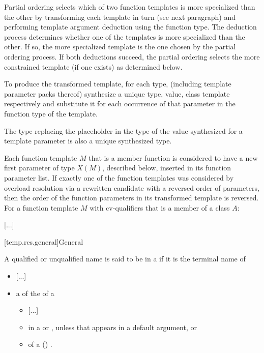 \documentclass{wg21}
\begin{document}
\pnum
Partial ordering selects which of two function templates is more
specialized than the other by transforming each template in turn
(see next paragraph) and performing template argument deduction
using the function type.
The deduction process determines whether
one of the templates is more specialized than the other. If so, the
more specialized template is the one chosen by the partial ordering
process.
If both deductions succeed, the partial ordering selects
the more constrained template (if one exists) as determined below.
%

To produce the transformed template, for each type,  (including template parameter packs 
thereof) synthesize a unique type, value,  class template 
respectively and substitute it for each occurrence of that parameter
in the function type of the template.


\begin{note}
    The type replacing the placeholder
    in the type of the value synthesized for a  template parameter
    is also a unique synthesized type.
\end{note}
Each function template $M$ that is a member function
is considered to have
a new first parameter of type $X(M)$, described below,
inserted in its function parameter list.
If exactly one of the function templates was considered by overload resolution
via a rewritten candidate 
with a reversed order of parameters,
then the order of the function parameters in its transformed template
is reversed.
For a function template $M$ with cv-qualifiers \cv{}
that is a member of a class $A$:

\textcolor{noteclr}{[...]}

[temp.res.general]{General}


%
A qualified or unqualified name is said to be in
a 
if it is the terminal name of
\begin{itemize}
\item \textcolor{noteclr}{[...]}
\item a  of the  of a
\begin{itemize}
    \item \textcolor{noteclr}{[...]}
    \item {} in a 
    or ,
    unless that  appears in a default argument, or
    \item {} of a () .
\end{itemize}
\end{itemize}
\end{document}
